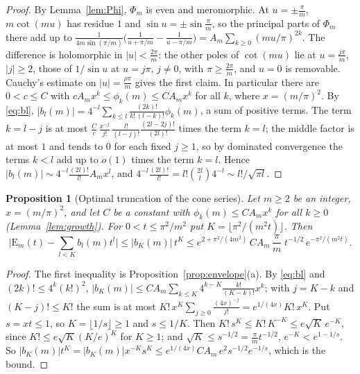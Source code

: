 \documentclass[pdflatex,sn-mathphys-num]{sn-jnl}
\theoremstyle{thmstyleone}%
\newtheorem{proposition}[theorem]{Proposition}%
\theoremstyle{thmstylethree}%
\begin{document}
\begin{appendices}
\begin{proof}
By Lemma~\ref{lem:Phi}, $\Phi_m$ is even and meromorphic. At $u=\pm\frac\pi m$, $m\cot(mu)$ has residue $1$ and $\sin u=\pm\sin\frac\pi m$, so the principal parts of $\Phi_m$ there add up to $\frac1{4m\sin(\pi/m)}\big(\frac1{u+\pi/m}-\frac1{u-\pi/m}\big)=A_m\sum_{k\ge0}(mu/\pi)^{2k}$. The difference is holomorphic in $|u|<\frac{2\pi}m$: the other poles of $\cot(mu)$ lie at $u=\frac{j\pi}m$, $|j|\ge2$, those of $1/\sin u$ at $u=j\pi$, $j\ne0$, with $\pi\ge\frac{2\pi}m$, and $u=0$ is removable. Cauchy's estimate on $|u|=\frac{\rho\pi}m$ gives the first claim. In particular there are $0<c\le C$ with $cA_mx^k\le\phi_k(m)\le CA_mx^k$ for all $k$, where $x=(m/\pi)^2$. By \eqref{eq:bl}, $|b_l(m)|=4^{-l}\sum_{k\le l}\frac{(2k)!}{k!\,(l-k)!}\phi_k(m)$, a sum of positive terms. The term $k=l-j$ is at most $\frac C c\,\frac{x^{-j}}{j!}\,\frac{l!}{(l-j)!}\frac{(2l-2j)!}{(2l)!}$ times the term $k=l$; the middle factor is at most $1$ and tends to $0$ for each fixed $j\ge1$, so by dominated convergence the terms $k<l$ add up to $o(1)$ times the term $k=l$. Hence $|b_l(m)|\sim4^{-l}\frac{(2l)!}{l!}A_mx^l$, and $4^{-l}\frac{(2l)!}{l!}=l!\binom{2l}l4^{-l}\sim l!/\sqrt{\pi l}$.
\end{proof}

\begin{proposition}[Optimal truncation of the cone series]\label{prop:opttrunc}
Let $m\ge2$ be an integer, $x=(m/\pi)^2$, and let $C$ be a constant with $\phi_k(m)\le CA_mx^k$ for all $k\ge0$ (Lemma~\ref{lem:growth}). For $0<t\le\pi^2/m^2$ put $K=\lfloor\pi^2/(m^2t)\rfloor$. Then
\[
  \Big|\mathrm E_m(t)-\sum_{l<K}b_l(m)t^l\Big|\le|b_K(m)|\,t^K\le e^{2+\pi^2/(4m^2)}\,C A_m\,\frac\pi m\;t^{-1/2}\,e^{-\pi^2/(m^2t)}.
\]
\end{proposition}

\begin{proof}
The first inequality is Proposition~\ref{prop:envelope}(a). By \eqref{eq:bl} and $(2k)!\le4^k(k!)^2$, $|b_K(m)|\le CA_m\sum_{k\le K}4^{k-K}\frac{k!}{(K-k)!}x^k$; with $j=K-k$ and $(K-j)!\le K!$ the sum is at most $K!\,x^K\sum_{j\ge0}\frac{(4x)^{-j}}{j!}=e^{1/(4x)}K!\,x^K$. Put $s=xt\le1$, so $K=\lfloor1/s\rfloor\ge1$ and $s\le1/K$. Then $K!\,s^K\le K!\,K^{-K}\le e\sqrt K\,e^{-K}$, since $K!\le e\sqrt K(K/e)^K$ for $K\ge1$; and $\sqrt K\le s^{-1/2}=\frac\pi m t^{-1/2}$, $e^{-K}<e^{1-1/s}$. So $|b_K(m)|t^K=|b_K(m)|x^{-K}s^K\le e^{1/(4x)}CA_m\,e^2s^{-1/2}e^{-1/s}$, which is the bound.
\end{proof}


\end{appendices}
\end{document}

